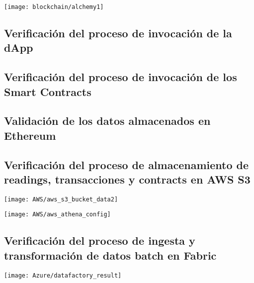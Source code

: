 \begin{center}
   \texttt{[image: blockchain/alchemy1]}
   \label{fig:alchemy1}
\end{center}


\subsection{Verificación del proceso de invocación de la dApp}

\subsection{Verificación del proceso de invocación de los Smart Contracts}

\subsection{Validación de los datos almacenados en Ethereum}

\subsection{Verificación del proceso de almacenamiento de readings, transacciones y contracts en AWS S3}


\begin{center}
   \texttt{[image: AWS/aws\_s3\_bucket\_data2]}
   \label{fig:aws_s3_bucket_data2}
\end{center}


\begin{center}
   \texttt{[image: AWS/aws\_athena\_config]}
   \label{fig:aws_athena_config}
\end{center}



\subsection{Verificación del proceso de ingesta y transformación de datos batch en Fabric}



\begin{center}
   \texttt{[image: Azure/datafactory\_result]}
   \label{fig:powerbi1}
\end{center}
 

